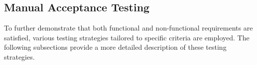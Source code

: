 \vspace{-1em}
\subsection{Manual Acceptance Testing} 

To further demonstrate that both functional and non-functional requirements are satisfied, various testing strategies tailored to specific criteria are employed. The following subsections provide a more detailed description of these testing strategies.






